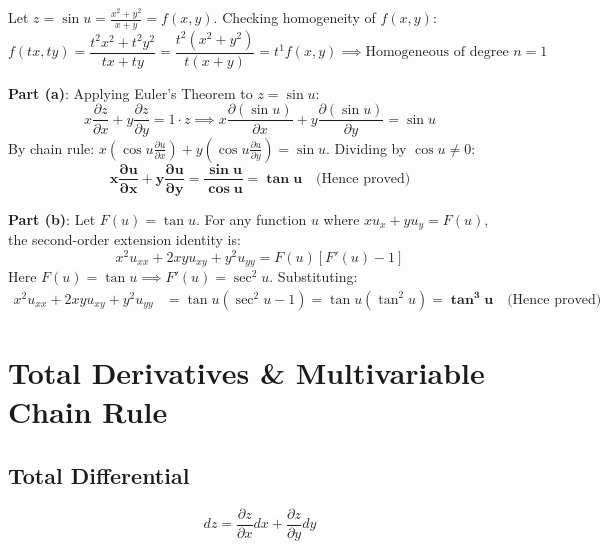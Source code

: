 \begin{solutionbox}
Let $z = \sin u = \frac{x^2+y^2}{x+y} = f(x,y)$.
Checking homogeneity of $f(x,y)$:
\begin{equation*}
    f(tx, ty) = \frac{t^2 x^2 + t^2 y^2}{tx + ty} = \frac{t^2(x^2+y^2)}{t(x+y)} = t^1 f(x,y) \implies \text{Homogeneous of degree } n = 1
\end{equation*}

\textbf{Part (a)}: Applying Euler's Theorem to $z = \sin u$:
\begin{equation*}
    x \frac{\partial z}{\partial x} + y \frac{\partial z}{\partial y} = 1 \cdot z \implies x \frac{\partial(\sin u)}{\partial x} + y \frac{\partial(\sin u)}{\partial y} = \sin u
\end{equation*}
By chain rule: $x (\cos u \frac{\partial u}{\partial x}) + y (\cos u \frac{\partial u}{\partial y}) = \sin u$.
Dividing by $\cos u \ne 0$:
\begin{equation*}
    \mathbf{x \frac{\partial u}{\partial x} + y \frac{\partial u}{\partial y} = \frac{\sin u}{\cos u} = \tan u} \quad \text{(Hence proved)}
\end{equation*}

\textbf{Part (b)}: Let $F(u) = \tan u$. For any function $u$ where $x u_x + y u_y = F(u)$, the second-order extension identity is:
\begin{equation*}
    x^2 u_{xx} + 2xy u_{xy} + y^2 u_{yy} = F(u)[F'(u) - 1]
\end{equation*}
Here $F(u) = \tan u \implies F'(u) = \sec^2 u$. Substituting:
\begin{align*}
    x^2 u_{xx} + 2xy u_{xy} + y^2 u_{yy} &= \tan u (\sec^2 u - 1) = \tan u (\tan^2 u) = \mathbf{\tan^3 u} \quad \text{(Hence proved)}
\end{align*}
\end{solutionbox}

\section{Total Derivatives \& Multivariable Chain Rule}

\subsection{Total Differential}
\begin{equation}
    dz = \frac{\partial z}{\partial x} dx + \frac{\partial z}{\partial y} dy
\end{equation}

